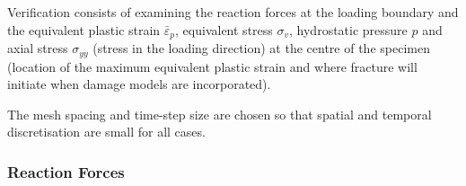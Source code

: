 \documentclass[sn-mathphys,Numbered,draft]{sn-jnl}%
\begin{document}
Verification consists of examining the reaction forces at the loading boundary and the equivalent plastic strain $\bar{\varepsilon}_p$, equivalent stress $\sigma_v$, hydrostatic pressure $p$ and axial stress $\sigma_{yy}$ (stress in the loading direction) at the centre of the specimen (location of the maximum equivalent plastic strain and where fracture will initiate when damage models are incorporated).

The mesh spacing and time-step size are chosen so that spatial and temporal discretisation are small for all cases.




%

\subsubsection{Reaction Forces}
\end{document}
